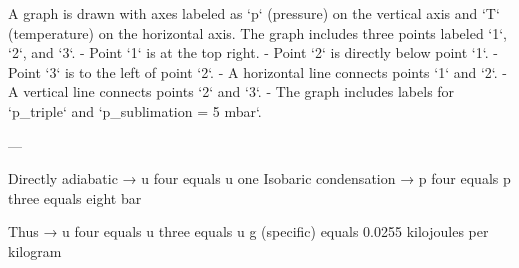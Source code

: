 A graph is drawn with axes labeled as `p` (pressure) on the vertical axis and `T` (temperature) on the horizontal axis. The graph includes three points labeled `1`, `2`, and `3`.  
- Point `1` is at the top right.  
- Point `2` is directly below point `1`.  
- Point `3` is to the left of point `2`.  
- A horizontal line connects points `1` and `2`.  
- A vertical line connects points `2` and `3`.  
- The graph includes labels for `p_triple` and `p_sublimation = 5 mbar`.  

---

Directly adiabatic → u four equals u one  
Isobaric condensation → p four equals p three equals eight bar  

Thus → u four equals u three equals u g (specific) equals 0.0255 kilojoules per kilogram